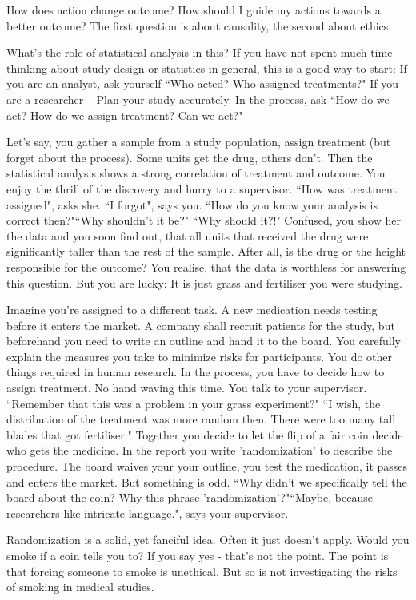 How does action change outcome?
How should I guide my actions towards a better outcome?
The first question is about causality, the second about ethics.

What's the role of statistical analysis in this?
If you have not spent much time thinking about study design or statistics in general, this is a good way to start: 
If you are an analyst, ask yourself “Who acted? Who assigned treatments?"
If you are a researcher -- Plan your study accurately. In the process, ask “How do we act? How do we assign treatment? Can we act?"

Let's say, you gather a sample from a study population, assign treatment (but forget about the process). Some units get the drug, others don't. Then the statistical analysis shows a strong correlation of treatment and outcome. You enjoy the thrill of the discovery and hurry to a supervisor. “How was treatment assigned", asks she. “I forgot", says you.
“How do you know your analysis is correct then?"“Why shouldn't it be?"
“Why should it?!"
Confused, you show her the data and you soon find out, that all units that received the drug were significantly taller than the rest of the sample.
After all, is the drug or the height responsible for the outcome?
You realise, that the data is worthless for answering this question.
But you are lucky: It is just grass and fertiliser you were studying.

Imagine you're assigned to a different task. A new medication needs testing before it enters the market. 
A company shall recruit patients for the study, but beforehand you need to write an outline and hand it to the board. You carefully  explain the measures you take to minimize risks for participants.
You do other things required in human research.
In the process, you have to decide how to assign treatment.
No hand waving this time. You talk to your supervisor.
“Remember that this was a problem in your grass experiment?"
“I wish, the distribution of the treatment was more random then. There were too many tall blades that got fertiliser."
Together you decide to let the flip of a fair coin decide who gets the medicine. In the report you write 'randomization' to describe the procedure. The board waives your your outline, you test the medication, it passes and enters the market. But something is odd. “Why didn't we specifically tell the board about the coin? Why this phrase 'randomization'?"“Maybe, because researchers like intricate language.", says your supervisor.

Randomization is a solid, yet fanciful idea. Often it just doesn't apply. Would you smoke if a coin tells you to? If you say yes - that's not the point. The point is that forcing someone to smoke is unethical. But so is not investigating the risks of smoking in medical studies.

